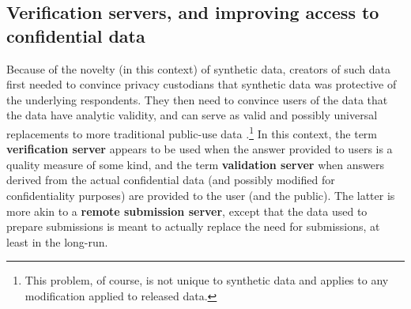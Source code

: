 \documentclass[inline]{hdsr}
\begin{document}
\subsection{Verification servers, and improving access to confidential data}
\label{sec1}

Because of the novelty (in this context) of synthetic data, creators of such data first needed to convince privacy custodians that synthetic data was protective of the underlying respondents. They then need to convince users of the data that the data have analytic validity, and can serve as valid and possibly universal replacements to more traditional public-use data \citep{reiter_verification_2009}.\footnote{This problem, of course, is not unique to synthetic data and applies to any modification applied to released data.} In this context, the term \textbf{verification server} appears to be used  when the answer provided to users is a quality measure of some kind, and the term \textbf{validation server} when answers derived from the actual confidential data (and possibly modified for confidentiality purposes) are provided to the user (and the public). The latter is more akin to a \textbf{remote submission server}, except that the data used to prepare submissions is meant to actually replace the need for submissions, at least in the long-run.  
\end{document}
